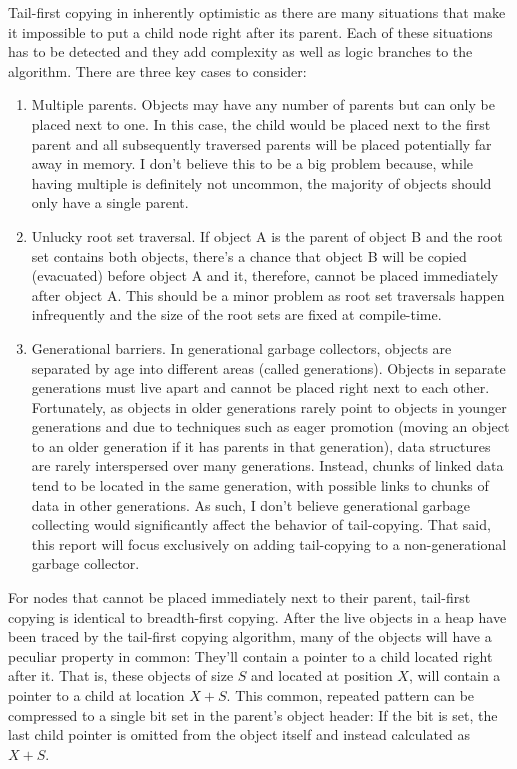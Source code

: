 \documentclass[a4paper,oneside]{memoir}
\begin{document}
Tail-first copying in inherently optimistic as there are many situations that
make it impossible to put a child node right after its parent. Each of these
situations has to be detected and they add complexity as well as logic branches
to the algorithm. There are three key cases to consider:
\begin{enumerate}
  \item Multiple parents. Objects may have any number of parents but can only be
  placed next to one. In this case, the child would be placed next to the first
  parent and all subsequently traversed parents will be placed potentially far
  away in memory. I don't believe this to be a big problem because, while having
  multiple is definitely not uncommon, the majority of objects should only have
  a single parent.
  \item
  Unlucky root set traversal. If object A is the parent of object B and the root
  set contains both objects, there's a chance that object B will be copied
  (evacuated) before object A and it, therefore, cannot be placed immediately
  after object A. This should be a minor problem as root set traversals happen
  infrequently and the size of the root sets are fixed at compile-time.
  \item
  Generational barriers. In generational garbage collectors, objects are
  separated by age into different areas (called generations). Objects in
  separate generations must live apart and cannot be placed right next to each
  other. Fortunately, as objects in older generations rarely point to objects in
  younger generations and due to techniques such as eager promotion (moving an
  object to an older generation if it has parents in that generation), data
  structures are rarely interspersed over many generations. Instead, chunks of
  linked data tend to be located in the same generation, with possible links
  to chunks of data in other generations. As such, I don't believe generational
  garbage collecting would significantly affect the behavior of tail-copying.
  That said, this report will focus exclusively on adding tail-copying to a
  non-generational garbage collector.
\end{enumerate}

For nodes that cannot be placed immediately next to their parent, tail-first
copying is identical to breadth-first copying.
\newline
\newline
After the live objects in a heap have been traced by the tail-first copying
algorithm, many of the objects will have a peculiar property in common: They'll
contain a pointer to a child located right after it. That is, these objects
of size $S$ and located at position $X$, will contain a pointer to a child at
location $X+S$. This common, repeated pattern can be compressed to a single bit
set in the parent's object header: If the bit is set, the last child pointer is
omitted from the object itself and instead calculated as $X+S$.
\end{document}
